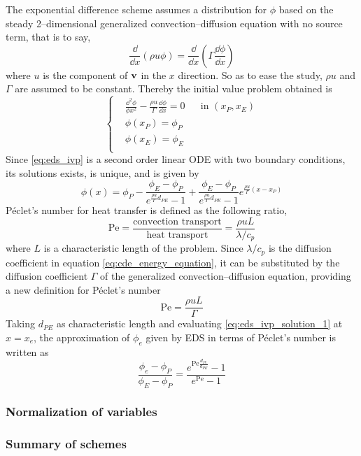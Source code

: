 The exponential difference scheme assumes a distribution for $\phi$ based on the steady 2--dimensional generalized convection--diffusion equation with no source term, that is to say,
\begin{equation}
	\frac{\dd}{\dd{x}} (\rho u \phi) = \frac{\dd}{\dd{x}} \left( \Gamma \frac{\dd{\phi}}{\dd{x}} \right)
\end{equation}
where $u$ is the component of $\vb{v}$ in the $x$ direction. So as to ease the study, $\rho u$ and $\Gamma$ are assumed to be constant. Thereby the initial value problem obtained is
\begin{equation} \label{eq:eds_ivp}
	\left\{
	\begin{aligned}
		&\frac{\dd^2 \phi}{\phi{x^2}} - \frac{\rho u}{\Gamma} \frac{\dd{\phi}}{\dd{x}} = 0 & &\text{in } (x_P, x_E) \\
		&\phi(x_P) = \phi_P \\
		&\phi(x_E) = \phi_E \\
	\end{aligned}
	\right.
\end{equation}
Since \eqref{eq:eds_ivp} is a second order linear ODE with two boundary conditions, its solutions exists, is unique, and is given by
\begin{equation} \label{eq:eds_ivp_solution_1}
	\phi(x) = 
	\phi_P - 
	\frac{\phi_E - \phi_P}{e^{\frac{\rho u}{\Gamma} d_{PE}} - 1} + 
	\frac{\phi_E - \phi_P}{e^{\frac{\rho u}{\Gamma} d_{PE}} - 1} e^{\frac{\rho u}{\Gamma} (x - x_P)}
\end{equation}
Péclet's number for heat transfer is defined as the following ratio,
\begin{equation}
	\mathrm{Pe} = 
	\frac{\text{convection transport}}{\text{heat transport}} = 
	\frac{\rho u L}{\lambda / c_p}
\end{equation}
where $L$ is a characteristic length of the problem. Since $\lambda / c_p$ is the diffusion coefficient in equation \eqref{eq:cde_energy_equation}, it can be substituted by the diffusion coefficient $\Gamma$ of the generalized convection--diffusion equation, providing a new definition for Péclet's number 
\begin{equation}
	\mathrm{Pe} = 
	\frac{\rho u L}{\Gamma}
\end{equation}
Taking $d_{PE}$ as characteristic length and evaluating \eqref{eq:eds_ivp_solution_1} at $x = x_e$, the approximation of $\phi_e$ given by EDS in terms of Péclet's number is written as
\begin{equation}
	\frac{\phi_e - \phi_P}{\phi_E - \phi_P} =
	\frac{e^{\mathrm{Pe} \frac{d_{Pe}}{d_{PE}}} - 1}{e^{\mathrm{Pe}} - 1} 
\end{equation}



\subsubsection{Normalization of variables}

\subsubsection{Summary of schemes}